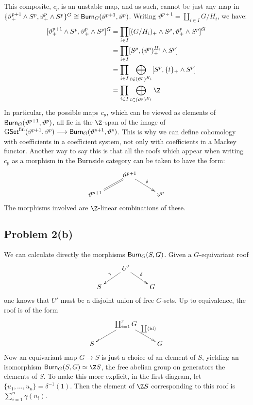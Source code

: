 \documentclass[11pt]{article}
\begin{document}
This composite, $c_p$ is an unstable map, and as such, cannot be just any map in $\{\vartheta_+^{p+1}\wedge S^p,\vartheta_+^{p}\wedge S^p\}^G\cong\operatorname{{\mathsf{Burn}}}_G(\vartheta^{p+1},\vartheta^p)$. Writing $\vartheta^{p+1}=\coprod_{i\in I}G/H_i$, we have:
\begin{alignat*}{2}
[\vartheta^{p+1}_+\wedge S^p,\vartheta^p_+\wedge S^p]^G&=\prod_{i\in I}[(G/H_i)_+\wedge S^p,\vartheta^p_+\wedge S^p]^G\\
&=\prod_{i\in I}[S^p,(\vartheta^p)^{H_i}_+\wedge S^p]\\
&=\prod_{i\in I}\bigoplus_{t\in(\vartheta^p)^{H_i}}[S^p,\{t\}_+\wedge S^p]\\
&=\prod_{i\in I}\bigoplus_{t\in(\vartheta^p)^{H_i}}\Z
\end{alignat*}
In particular, the possible maps $c_p$, which can be viewed as elements of $\operatorname{{\mathsf{Burn}}}_G(\vartheta^{p+1},\vartheta^p)$, all lie in the $\Z$-span of the image of $\operatorname{{G\mathsf{Set}^\textup{fin}}}(\vartheta^{p+1},\vartheta^p)\longrightarrow\operatorname{{\mathsf{Burn}}}_G(\vartheta^{p+1},\vartheta^p)$. This is why we can define cohomology with coefficients in a coefficient system, not only with coefficients in a Mackey functor. Another way to say this is that all the roofs which appear when writing $c_p$ as a morphism in the Burnside category can be taken to have the form:
\[\xymatrix@R=5mm{&\vartheta^{p+1}\ar@{=}[dl]\ar[dr]^\delta\\
\vartheta^{p+1}&&\vartheta^p}\]
The morphisms involved are $\Z$-linear combinations of these.
\subsection*{Problem 2(b)}
We can calculate directly the morphisms $\operatorname{{\mathsf{Burn}}}_G(S,G)$. Given a $G$-equivariant roof
\[\xymatrix@R=5mm{&U'\ar[dl]_\gamma\ar[dr]^\delta\\S&&G}\]
one knows that $U'$ must be a disjoint union of free $G$-sets. Up to equivalence, the roof is of the form
\[\xymatrix@R=5mm{&\coprod_{i=1}^rG\ar[dl]\ar[dr]^{\coprod(\id)}\\S&&G}\]
Now an equivariant map $G\to S$ is just a choice of an element of $S$, yielding an isomorphism $\Burnside_G(S,G)\simeq\Z S$, the free abelian group on generators the elements of $S$. To make this more explicit, in the first diagram, let $\{u_1,\ldots, u_n\}=\delta^{-1}(1)$. Then the element of $\Z S$ corresponding to this roof is $\sum_{i=1}^n\gamma(u_i)$.
\end{document}
